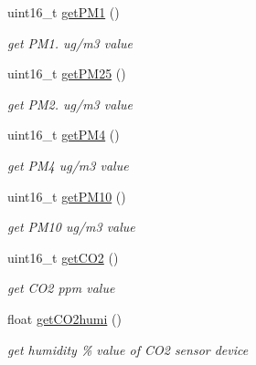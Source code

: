 \begin{DoxyCompactItemize}
\mbox{\label{classSensors_a515884007d9b5239c2321ec0695f69e8}} 
uint16\+\_\+t \hyperlink{classSensors_a515884007d9b5239c2321ec0695f69e8}{get\+P\+M1} ()
\begin{DoxyCompactList}\small\item\em get P\+M1. ug/m3 value \end{DoxyCompactList}\item 
\mbox{\label{classSensors_adc3ad26b8a9be10b2100e3b023fdefc4}} 
uint16\+\_\+t \hyperlink{classSensors_adc3ad26b8a9be10b2100e3b023fdefc4}{get\+P\+M25} ()
\begin{DoxyCompactList}\small\item\em get P\+M2. ug/m3 value \end{DoxyCompactList}\item 
\mbox{\label{classSensors_aca9b394c691568c7bd3499cba0b67403}} 
uint16\+\_\+t \hyperlink{classSensors_aca9b394c691568c7bd3499cba0b67403}{get\+P\+M4} ()
\begin{DoxyCompactList}\small\item\em get P\+M4 ug/m3 value \end{DoxyCompactList}\item 
\mbox{\label{classSensors_a8165734cd6b82243549ba6bd1c7a837a}} 
uint16\+\_\+t \hyperlink{classSensors_a8165734cd6b82243549ba6bd1c7a837a}{get\+P\+M10} ()
\begin{DoxyCompactList}\small\item\em get P\+M10 ug/m3 value \end{DoxyCompactList}\item 
\mbox{\label{classSensors_ad953d4564cc20d8134cccd962435dd81}} 
uint16\+\_\+t \hyperlink{classSensors_ad953d4564cc20d8134cccd962435dd81}{get\+C\+O2} ()
\begin{DoxyCompactList}\small\item\em get C\+O2 ppm value \end{DoxyCompactList}\item 
\mbox{\label{classSensors_a7fa1fe8f4f3469bce9311be880c243df}} 
float \hyperlink{classSensors_a7fa1fe8f4f3469bce9311be880c243df}{get\+C\+O2humi} ()
\begin{DoxyCompactList}\small\item\em get humidity \% value of C\+O2 sensor device \end{DoxyCompactList}\item 

\end{DoxyCompactItemize}
